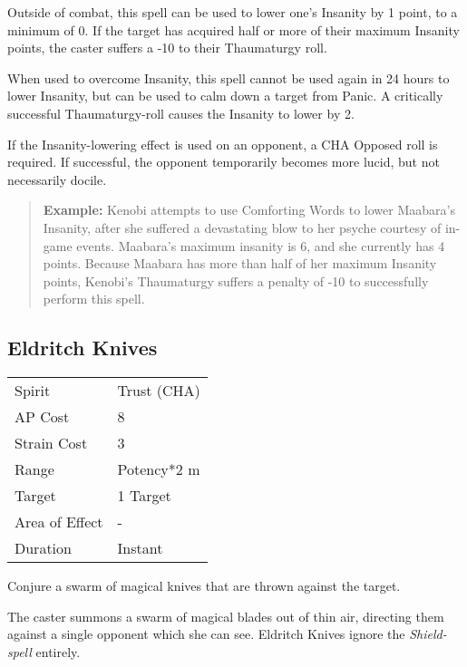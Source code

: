 \documentclass[11pt,a4paper,twocolumn]{book}
\begin{document}
Outside of combat, this spell can be used to lower one's Insanity by 1 point, to a minimum of 0. If the target has acquired half or more of their maximum Insanity points, the caster suffers a -10 to their Thaumaturgy roll.

When used to overcome Insanity, this spell cannot be used again in 24 hours to lower Insanity, but can be used to calm down a target from Panic. A critically successful Thaumaturgy-roll causes the Insanity to lower by 2.

If the Insanity-lowering effect is used on an opponent, a CHA Opposed roll is required. If successful, the opponent temporarily becomes more lucid, but not necessarily docile.

\begin{verse}
	\textbf{Example:} Kenobi attempts to use Comforting Words to lower Maabara's Insanity, after she suffered a devastating blow to her psyche courtesy of in-game events. Maabara's maximum insanity is 6, and she currently has 4 points. Because Maabara has more than half of her maximum Insanity points, Kenobi's Thaumaturgy suffers a penalty of -10 to successfully perform this spell.
\end{verse}


\subsection*{Eldritch Knives}
{
	\begin{tabu} to 75mm{| X[l,4] | X[l,7] |}
		\hline
		Spirit         & Trust (CHA) \\
		AP Cost        & 8           \\
		Strain Cost    & 3           \\
		Range          & Potency*2 m \\
		Target         & 1 Target    \\
		Area of Effect & -           \\
		Duration       & Instant     \\ \hline
	\end{tabu}
	
}

\medskip

Conjure a swarm of magical knives that are thrown against the target.

The caster summons a swarm of magical blades out of thin air, directing them against a single opponent which she can see. Eldritch Knives ignore the \textit{Shield-spell} entirely.
\end{document}
